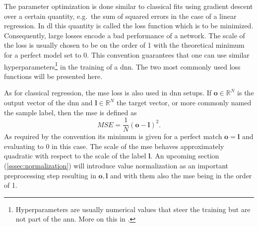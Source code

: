 \label{sssec:dl-loss}

The parameter optimization is done similar to classical fits using gradient descent over a certain quantity, e.g.\ the sum of squared errors in the case of a linear regression. In \gls{dl} this quantity is called the loss function which is to be minimized. Consequently, large losses encode a bad performance of a network. The scale of the loss is usually chosen to be on the order of 1 with the theoretical minimum for a perfect model set to 0. This convention guarantees that one can use similar hyperparameters\footnote{Hyperparameters are usually numerical values that steer the training but are not part of the \gls{ann}. More on this in .} in the training of a \gls{dnn}. The two most commonly used loss functions will be presented here.

As for classical regression, the \gls{mse} loss is also used in \gls{dnn} setups. If \(\bm o\in \mathbb{R}^N\) is the output vector of the \gls{dnn} and \(\bm l\in \mathbb{R}^N\) the target vector, or more commonly named the sample label, then the \gls{mse} is defined as \begin{equation}
     MSE = \frac1{N}{(\bm o - \bm l)}^2 .
\end{equation} As required by the convention its minimum is given for a perfect match \(\bm o = \bm l\) and evaluating to 0 in this case. The scale of the \gls{mse} behaves approximately quadratic with respect to the scale of the label \(\bm l\). An upcoming section (\ref{sssec:normalization}) will introduce value normalization as an important preprocessing step resulting in \(\bm o, \bm l\) and with them also the \gls{mse} being in the order of 1.

